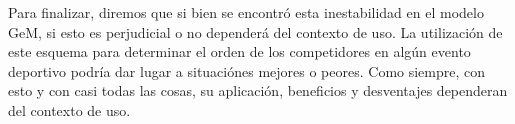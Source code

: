 \par Para finalizar, diremos que si bien se encontr\'o esta inestabilidad en el
modelo GeM, si esto es perjudicial o no depender\'a del contexto de uso. La
utilizaci\'on de este esquema para determinar el orden de los competidores en
alg\'un evento deportivo podr\'ia dar lugar a situaci\'ones mejores o peores.
Como siempre, con esto y con casi todas las cosas, su aplicaci\'on, beneficios y
desventajes dependeran del contexto de uso.
